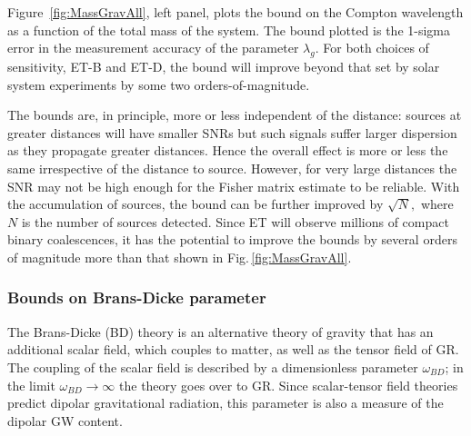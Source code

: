 
Figure~\ref{fig:MassGravAll}, left panel, plots the bound on the Compton 
wavelength as a function of the total mass of the system.  The bound plotted is
the 1-sigma error in the measurement accuracy of the parameter $\lambda_g.$
For both choices of sensitivity, ET-B and ET-D, the bound will improve 
beyond that set by solar system experiments by some two orders-of-magnitude. 

The bounds are, in principle, more or less independent of the distance:
sources at greater distances will have smaller SNRs but such signals suffer
larger dispersion as they propagate greater distances. Hence the overall 
effect is more or less the same irrespective of the distance to source.  
However, for very large distances the SNR may not be high enough for 
the Fisher matrix estimate to be reliable. With the accumulation of
sources, the bound can be further improved by $\sqrt{N},$ where $N$
is the number of sources detected. Since ET will observe millions of compact 
binary coalescences, it has the potential to improve the bounds by
several orders of magnitude more than that shown in Fig.\,\ref{fig:MassGravAll}.

\subsubsection{Bounds on Brans-Dicke parameter}

The Brans-Dicke (BD) theory \cite{BransDicke61} is an alternative theory
of gravity that has an additional scalar field, which couples to matter,
as well as the tensor field of GR.
The coupling of the scalar field is described by a dimensionless parameter
$\omega_{BD}$; in the limit $\omega_{BD}\rightarrow\infty$ the theory 
goes over to GR.  Since scalar-tensor field  theories predict dipolar 
gravitational radiation, this parameter is also a measure of the dipolar 
GW content.

